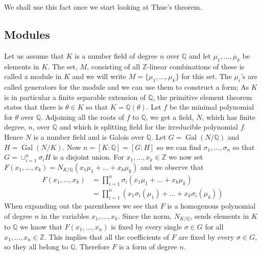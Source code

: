 \documentclass{article}
\DeclareMathOperator{\Gal}{Gal}
\newcommand{\mbb}[1]{\mathbb{#1}}
\numberwithin{equation}{section}
\begin{document}
We shall use this fact once we start looking at Thue's theorem.




\subsection{Modules}
Let us assume that $K$ is a number field of degree $n$ over $\mbb Q$ and let $\mu_1, ..., \mu_k$ be elements in $K$. The set, $M$, consisting of all $\mbb{Z}$-linear combinations of these is called a module in $K$ and we will write $M = \{\mu_1, ..., \mu_k\}$ for this set. The $\mu_i$'s are called generators for the module and we can use them to construct a form; As $K$ is in particular a finite separable extension of $\mbb Q$, the primitive element theorem states that there is $\theta \in K$ so that $K = \mbb Q(\theta)$. Let $f$ be the minimal polynomial for $\theta$ over $\mbb Q$. Adjoining all the roots of $f$ to $\mbb Q$, we get a field, $N$, which has finite degree, $n$, over $\mbb Q$ and which is splitting field for the irreducible polynomial $f$. Hence $N$ is a number field and is Galois over $\mbb Q$. Let $G = \Gal(N / \mbb Q)$ and $H = \Gal(N / K)$. Now $n = [K : \mbb Q] = [G : H]$ so we can find $\sigma_1, ..., \sigma_n$ so that
$G = \cup_{i=1}^n \sigma_i H$
is a disjoint union. For $x_1, ..., x_k \in \mbb Z$ we now set $F(x_1, ..., x_k) = N_{K/\mbb Q}(x_1 \mu_1 + ... + x_k \mu_k)$ and we observe that
\begin{align*}
    F(x_1, ..., x_k) & = \prod_{i = 1}^n \sigma_i(x_1 \mu_1 + ... + x_k \mu_k)                         \\
                     & = \prod_{i = 1}^n \left(x_1 \sigma_i(\mu_1) + ... + x_k \sigma_i(\mu_k) \right)
\end{align*}
When expanding out the parentheses we see that $F$ is a homogenous polynomial of degree $n$ in the variables $x_1, ..., x_k$. Since the norm, $N_{K/\mbb Q}$, sends elements in $K$ to $\mbb Q$ we know that $F(x_1, ..., x_n)$ is fixed by every single $\sigma \in G$ for all $x_1, ..., x_n \in \mbb Z$. This implies that all the coefficients of $F$ are fixed by every $\sigma \in G$, so they all belong to $\mbb Q$. Therefore $F$ is a form of degree $n$.
\end{document}
